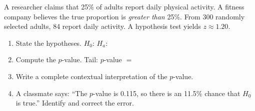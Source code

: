 \documentclass[10pt]{article}
\begin{document}
\namedateperiod

\vspace{0.15in}

A researcher claims that 25\% of adults report daily physical activity. A fitness company
believes the true proportion is \emph{greater than} 25\%. From 300 randomly selected adults,
84 report daily activity. A hypothesis test yields $z \approx 1.20$.

\begin{enumerate}
  \item State the hypotheses.
        $H_0$: \blank{4cm} \quad $H_a$: \blank{4cm}

  \item Compute the $p$-value.
        Tail: \blank{2cm} \quad $p$-value $=$ \blank{4cm}

  \item Write a complete contextual interpretation of the $p$-value.

  \item A classmate says: ``The $p$-value is 0.115, so there is an 11.5\% chance that
        $H_0$ is true.'' Identify and correct the error.
\end{enumerate}
\end{document}
